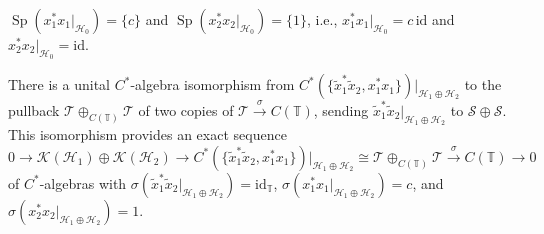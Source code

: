 \documentclass[pdftex]{sigma}
\begin{document}
\begin{corollary}\label{H0spectrum} $\operatorname{Sp}( x_{1}^{\ast}x_{1}%
|_{\mathcal{H}_{0}}) =\{c\} $ and $\operatorname{Sp}
( x_{2}^{\ast}x_{2}|_{\mathcal{H}_{0}}) =\{1\} $,
i.e., $x_{1}^{\ast}x_{1}|_{\mathcal{H}_{0}}=c\, \mathrm{id}$ and $x_{2}^{\ast
}x_{2}|_{\mathcal{H}_{0}}=\mathrm{id}$.
\end{corollary}

\begin{proposition}\label{iso} There is a unital $C^*$-algebra isomorphism from
$C^{\ast}( \{ \tilde{x}_{1}^{\ast}\tilde{x}_{2},x_{1}^{\ast}%
x_{1} \} ) |_{\mathcal{H}_{1}\oplus\mathcal{H}_{2}}$ to the
pullback $\mathcal{T}\oplus_{C(\mathbb{T}) }\mathcal{T}$ of two
copies of $\mathcal{T}\overset{\sigma}{\rightarrow}C(\mathbb{T})
$, sending $\tilde{x}_{1}^{\ast}\tilde{x}_{2}|_{\mathcal{H}_{1}\oplus
\mathcal{H}_{2}}$ to $\mathcal{S}\oplus\mathcal{S}$. This isomorphism provides
an exact sequence%
\[
0\rightarrow\mathcal{K}( \mathcal{H}_{1}) \oplus\mathcal{K}%
( \mathcal{H}_{2}) \rightarrow C^{\ast}(\{ \tilde
{x}_{1}^{\ast}\tilde{x}_{2},x_{1}^{\ast}x_{1}\} ) |_{\mathcal{H}%
_{1}\oplus\mathcal{H}_{2}}\cong\mathcal{T}\oplus_{C(\mathbb{T})
}\mathcal{T}\overset{\sigma}{\rightarrow}C(\mathbb{T})
\rightarrow0
\]
of $C^*$-algebras with $\sigma( \tilde{x}_{1}^{\ast}\tilde{x}%
_{2}|_{\mathcal{H}_{1}\oplus\mathcal{H}_{2}}) =\mathrm{id}_{\mathbb{T}%
}$, $\sigma( x_{1}^{\ast}x_{1}|_{\mathcal{H}_{1}\oplus\mathcal{H}_{2}%
}) =c$, and $\sigma( x_{2}^{\ast}x_{2}|_{\mathcal{H}_{1}%
\oplus\mathcal{H}_{2}}) =1$.
\end{proposition}
\end{document}
